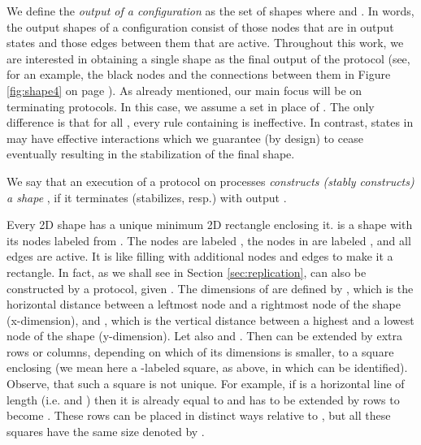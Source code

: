 \documentclass[oribibl, 11pt]{llncs}
\begin{document}
We define the \emph{output of a configuration}  as the set of shapes  where  and . In words, the output shapes of a configuration consist of those nodes that are in output states and those edges between them that are active. Throughout this work, we are interested in obtaining a single shape as the final output of the protocol (see, for an example, the black nodes and the connections between them in Figure \ref{fig:shape4} on page \pageref{fig:shape4}). As already mentioned, our main focus will be on terminating protocols. In this case, we assume a set  in place of . The only difference is that for all , every rule containing  is ineffective. In contrast, states in  may have effective interactions which we guarantee (by design) to cease eventually resulting in the stabilization of the final shape. 

\begin{definition}
We say that an execution of a protocol on  processes \emph{constructs (stably constructs) a shape} , if it terminates (stabilizes, resp.) with output .
\end{definition}

Every 2D shape  has a unique minimum 2D rectangle  enclosing it.  is a shape with its nodes labeled from . The nodes  are labeled , the nodes in  are labeled , and all edges are active. It is like filling  with additional nodes and edges to make it a rectangle. In fact, as we shall see in Section \ref{sec:replication},  can also be constructed by a protocol, given . The dimensions of  are defined by , which is the horizontal distance between a leftmost node and a rightmost node of the shape (x-dimension), and , which is the vertical distance between a highest and a lowest node of the shape (y-dimension). Let also  and . Then  can be extended by  extra rows or columns, depending on which of its dimensions is smaller, to a  square  enclosing  (we mean here a -labeled square, as above, in which  can be identified). Observe, that such a square is not unique. For example, if  is a horizontal line of length  (i.e.  and ) then it is already equal to  and has to be extended by  rows to become . These rows can be placed in  distinct ways relative to , but all these squares have the same size  denoted by .
\end{document}
